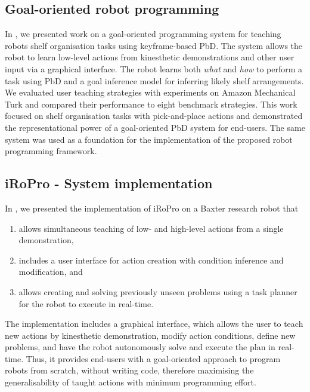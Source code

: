 \subsection {Goal-oriented robot programming}
In , we presented work on a goal-oriented programming system for teaching robots shelf organisation tasks using keyframe-based PbD. 
The system allows the robot to learn low-level actions from kinesthetic demonstrations and other user input via a graphical interface.
The robot learns both \textit{what} and \textit{how} to perform a task using PbD and a goal inference model for inferring likely shelf arrangements.
We evaluated user teaching strategies with experiments on Amazon Mechanical Turk and compared their performance to eight benchmark strategies.
This work focused on shelf organisation tasks with pick-and-place actions and demonstrated the representational power of a goal-oriented PbD system for end-users. 
The same system was used as a foundation for the implementation of the proposed robot programming framework.

	
\subsection{iRoPro - System implementation}
In , we presented the implementation of iRoPro on a Baxter research robot that 
		\begin{enumerate}
			\item allows simultaneous teaching of low- and high-level actions from a single demonstration, 
			\item includes a user interface for action creation with condition inference and modification, and
			\item allows creating and solving previously unseen problems using a task planner for the robot to execute in real-time.
		\end{enumerate}
The implementation includes a graphical interface, which allows the user to teach new actions by kinesthetic demonstration, modify action conditions, define new problems, and have the robot autonomously solve and execute the plan in real-time.
Thus, it provides end-users with a goal-oriented approach to program robots from scratch, without writing code, therefore maximising the generalisability of taught actions with minimum programming effort.
	
